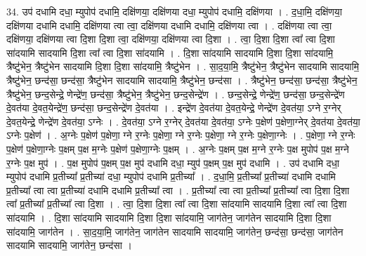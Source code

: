 \documentclass[17pt]{extarticle}
\begin{document}
34. उप॑ दधामि दधा॒ म्युपोप॑ दधामि॒ दक्षि॑णया॒ दक्षि॑णया दधा॒ म्युपोप॑ दधामि॒ दक्षि॑णया । . द॒धा॒मि॒ दक्षि॑णया॒ दक्षि॑णया दधामि दधामि॒ दक्षि॑णया त्वा त्वा॒ दक्षि॑णया दधामि दधामि॒ दक्षि॑णया त्वा । . दक्षि॑णया त्वा त्वा॒ दक्षि॑णया॒ दक्षि॑णया त्वा दि॒शा दि॒शा त्वा॒ दक्षि॑णया॒ दक्षि॑णया त्वा दि॒शा । . त्वा॒ दि॒शा दि॒शा त्वा᳚ त्वा दि॒शा सा॑दयामि सादयामि दि॒शा त्वा᳚ त्वा दि॒शा सा॑दयामि । . दि॒शा सा॑दयामि सादयामि दि॒शा दि॒शा सा॑दयामि॒ त्रैष्टु॑भेन॒ त्रैष्टु॑भेन सादयामि दि॒शा दि॒शा सा॑दयामि॒ त्रैष्टु॑भेन । . सा॒द॒या॒मि॒ त्रैष्टु॑भेन॒ त्रैष्टु॑भेन सादयामि सादयामि॒ त्रैष्टु॑भेन॒ छन्द॑सा॒ छन्द॑सा॒ त्रैष्टु॑भेन सादयामि सादयामि॒ त्रैष्टु॑भेन॒ छन्द॑सा । . त्रैष्टु॑भेन॒ छन्द॑सा॒ छन्द॑सा॒ त्रैष्टु॑भेन॒ त्रैष्टु॑भेन॒ छन्द॒सेन्द्रे॒ णेन्द्रे॑ण॒ छन्द॑सा॒ त्रैष्टु॑भेन॒ त्रैष्टु॑भेन॒ छन्द॒सेन्द्रे॑ण । . छन्द॒सेन्द्रे॒ णेन्द्रे॑ण॒ छन्द॑सा॒ छन्द॒सेन्द्रे॑ण दे॒वत॑या दे॒वत॒येन्द्रे॑ण॒ छन्द॑सा॒ छन्द॒सेन्द्रे॑ण दे॒वत॑या । . इन्द्रे॑ण दे॒वत॑या दे॒वत॒येन्द्रे॒ णेन्द्रे॑ण दे॒वत॑या॒ ऽग्ने र॒ग्नेर् दे॒वत॒येन्द्रे॒ णेन्द्रे॑ण दे॒वत॑या॒ ऽग्नेः । . दे॒वत॑या॒ ऽग्ने र॒ग्नेर् दे॒वत॑या दे॒वत॑या॒ ऽग्नेः प॒क्षेण॑ प॒क्षेणा॒ग्नेर् दे॒वत॑या दे॒वत॑या॒ ऽग्नेः प॒क्षेण॑ । . अ॒ग्नेः प॒क्षेण॑ प॒क्षेणा॒ ग्ने र॒ग्नेः प॒क्षेणा॒ ग्ने र॒ग्नेः प॒क्षेणा॒ ग्ने र॒ग्नेः प॒क्षेणा॒ग्नेः । . प॒क्षेणा॒ ग्ने र॒ग्नेः प॒क्षेण॑ प॒क्षेणा॒ग्नेः प॒क्षम् प॒क्ष म॒ग्नेः प॒क्षेण॑ प॒क्षेणा॒ग्नेः प॒क्षम् । . अ॒ग्नेः प॒क्षम् प॒क्ष म॒ग्ने र॒ग्नेः प॒क्ष मुपोप॑ प॒क्ष म॒ग्ने र॒ग्नेः प॒क्ष मुप॑ । . प॒क्ष मुपोप॑ प॒क्षम् प॒क्ष मुप॑ दधामि दधा॒ म्युप॑ प॒क्षम् प॒क्ष मुप॑ दधामि । . उप॑ दधामि दधा॒ म्युपोप॑ दधामि प्र॒तीच्या᳚ प्र॒तीच्या॑ दधा॒ म्युपोप॑ दधामि प्र॒तीच्या᳚ । . द॒धा॒मि॒ प्र॒तीच्या᳚ प्र॒तीच्या॑ दधामि दधामि प्र॒तीच्या᳚ त्वा त्वा प्र॒तीच्या॑ दधामि दधामि प्र॒तीच्या᳚ त्वा । . प्र॒तीच्या᳚ त्वा त्वा प्र॒तीच्या᳚ प्र॒तीच्या᳚ त्वा दि॒शा दि॒शा त्वा᳚ प्र॒तीच्या᳚ प्र॒तीच्या᳚ त्वा दि॒शा । . त्वा॒ दि॒शा दि॒शा त्वा᳚ त्वा दि॒शा सा॑दयामि सादयामि दि॒शा त्वा᳚ त्वा दि॒शा सा॑दयामि । . दि॒शा सा॑दयामि सादयामि दि॒शा दि॒शा सा॑दयामि॒ जाग॑तेन॒ जाग॑तेन सादयामि दि॒शा दि॒शा सा॑दयामि॒ जाग॑तेन । . सा॒द॒या॒मि॒ जाग॑तेन॒ जाग॑तेन सादयामि सादयामि॒ जाग॑तेन॒ छन्द॑सा॒ छन्द॑सा॒ जाग॑तेन सादयामि सादयामि॒ जाग॑तेन॒ छन्द॑सा । \newline
\pagebreak
{}
\end{document}
